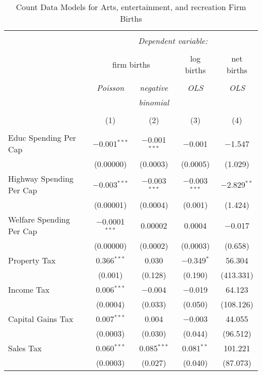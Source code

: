 
\begin{table}[!htbp] \centering 
  \caption{Count Data Models for Arts, entertainment, and recreation Firm Births} 
  \label{} 
\begin{tabular}{@{\extracolsep{5pt}}lcccc} 
\\[-1.8ex]\hline 
\hline \\[-1.8ex] 
 & \multicolumn{4}{c}{\textit{Dependent variable:}} \\ 
\cline{2-5} 
\\[-1.8ex] & \multicolumn{2}{c}{firm births} & log births & net births \\ 
\\[-1.8ex] & \textit{Poisson} & \textit{negative} & \textit{OLS} & \textit{OLS} \\ 
 & \textit{} & \textit{binomial} & \textit{} & \textit{} \\ 
\\[-1.8ex] & (1) & (2) & (3) & (4)\\ 
\hline \\[-1.8ex] 
 Educ Spending Per Cap & $-$0.001$^{***}$ & $-$0.001$^{***}$ & $-$0.001 & $-$1.547 \\ 
  & (0.00000) & (0.0003) & (0.0005) & (1.029) \\ 
  Highway Spending Per Cap  & $-$0.003$^{***}$ & $-$0.003$^{***}$ & $-$0.003$^{***}$ & $-$2.829$^{**}$ \\ 
  & (0.00001) & (0.0004) & (0.001) & (1.424) \\ 
  Welfare Spending Per Cap  & $-$0.0001$^{***}$ & 0.00002 & 0.0004 & $-$0.017 \\ 
  & (0.00000) & (0.0002) & (0.0003) & (0.658) \\ 
  Property Tax & 0.366$^{***}$ & 0.030 & $-$0.349$^{*}$ & 56.304 \\ 
  & (0.001) & (0.128) & (0.190) & (413.331) \\ 
  Income Tax & 0.006$^{***}$ & $-$0.004 & $-$0.019 & 64.123 \\ 
  & (0.0004) & (0.033) & (0.050) & (108.126) \\ 
  Capital Gains Tax & 0.007$^{***}$ & 0.004 & $-$0.003 & 44.055 \\ 
  & (0.0003) & (0.030) & (0.044) & (96.512) \\ 
  Sales Tax & 0.060$^{***}$ & 0.085$^{***}$ & 0.081$^{**}$ & 101.221 \\ 
  & (0.0003) & (0.027) & (0.040) & (87.073) \\ 

\end{tabular}
\end{table}
